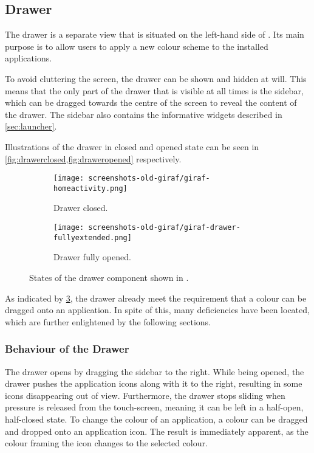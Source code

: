 \subsection{Drawer}\label{sec:launcher:drawer}
The drawer is a separate view that is situated on the left-hand side of \homeactivity.
Its main purpose is to allow \launcher users to apply a new colour scheme to the installed \giraf applications.

To avoid cluttering the screen, the drawer can be shown and hidden at will.
This means that the only part of the drawer that is visible at all times is the sidebar, which can be dragged towards the centre of the screen to reveal the content of the drawer.
The sidebar also contains the informative widgets described in \cref{sec:launcher}.

Illustrations of the drawer in closed and opened state can be seen in \cref{fig:drawerclosed,fig:draweropened} respectively.

\begin{figure}[h] %
\centering
	\begin{subfigure}[b]{.48\textwidth}
	\centering
	\texttt{[image: screenshots-old-giraf/giraf-homeactivity.png]}
	\caption{Drawer closed.}
	\label{fig:drawerclosed}
	\end{subfigure}
	\hfill
	\begin{subfigure}[b]{.48\textwidth}
	\centering
	\texttt{[image: screenshots-old-giraf/giraf-drawer-fullyextended.png]}
	\caption{Drawer fully opened.}
	\label{fig:draweropened}
	\end{subfigure}
\caption{States of the drawer component shown in \homeactivity.}
\label{fig:drawerstates}
\end{figure}

As indicated by \cref{fig:drawerstates}, the drawer already meet the requirement that a colour can be dragged onto an application.
In spite of this, many deficiencies have been located, which are further enlightened by the following sections.

\subsubsection{Behaviour of the Drawer}\label{sec:drawer:behaviour}
The drawer opens by dragging the sidebar to the right.
While being opened, the drawer pushes the application icons along with it to the right, resulting in some icons disappearing out of view.
Furthermore, the drawer stops sliding when pressure is released from the touch-screen, meaning it can be left in a half-open, half-closed state.
To change the colour of an application, a colour can be dragged and dropped onto an application icon. 
The result is immediately apparent, as the colour framing the icon changes to the selected colour.

